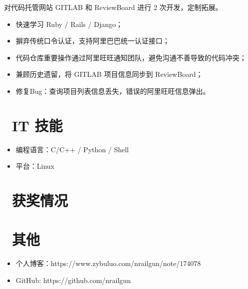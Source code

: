 \documentclass{resume}
\begin{document}
对代码托管网站 GITLAB 和 ReviewBoard 进行 2 次开发，定制拓展。
\begin{onehalfspacing}
\begin{itemize}
  \item 快速学习 Ruby / Rails / Django；
  \item 摒弃传统口令认证，支持阿里巴巴统一认证接口；
  \item 代码仓库重要操作通过阿里旺旺通知团队，避免沟通不善导致的代码冲突；
  \item 兼顾历史遗留，将 GITLAB 项目信息同步到 ReviewBoard；
  \item 修复Bug：查询项目列表信息丢失，错误的阿里旺旺信息弹出。
\end{itemize}
\end{onehalfspacing}


\section{\faCogs\ IT 技能}
\begin{itemize}[parsep=0.5ex]
  \item 编程语言：C/C++ / Python / Shell
  \item 平台：Linux
\end{itemize}

\section{\faHeartO\ 获奖情况}

\section{\faInfo\ 其他}
\begin{itemize}[parsep=0.5ex]
  \item 个人博客：https://www.zybuluo.com/nrailgun/note/174078
  \item GitHub: https://github.com/nrailgun
\end{itemize}

%
%
\end{document}
